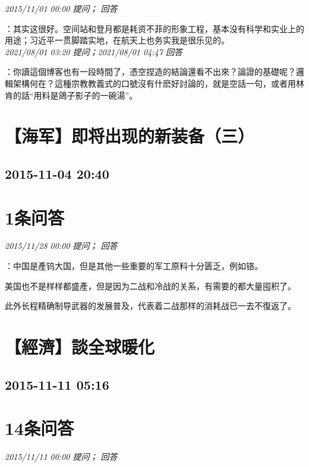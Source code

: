 \documentclass[twocolumn]{ctexart}
\begin{document}
\textit{\hfill\noindent\small 2015/11/01 00:00 提问； 回答}

：其实这很好。空间站和登月都是耗资不菲的形象工程，基本没有科学和实业上的用途；习近平一贯脚踏实地，在航天上也务实我是很乐见的。\\

\textit{\hfill\noindent\small 2021/08/01 03:20 提问；2021/08/01 04:47 回答}

：你讀這個博客也有一段時間了，憑空捏造的結論還看不出來？論證的基礎呢？邏輯架構何在？這種宗教教義式的口號沒有什麽好討論的，就是空話一句，或者用林肯的話“用料是鴿子影子的一碗湯”。
\\


\section{【海军】即将出现的新装备（三）}
\subsection{2015-11-04 20:40}


\section{1条问答}

\textit{\hfill\noindent\small 2015/11/28 00:00 提问； 回答}

：中国是產钨大国，但是其他一些重要的军工原料十分匮乏，例如铬。

美国也不是样样都盛產，但是因为二战和冷战的关系，有需要的都大量囤积了。

此外长程精确制导武器的发展普及，代表着二战那样的消耗战已一去不復返了。\\


\section{【經濟】談全球暖化}
\subsection{2015-11-11 05:16}


\section{14条问答}

\textit{\hfill\noindent\small 2015/11/11 00:00 提问； 回答}
\end{document}
